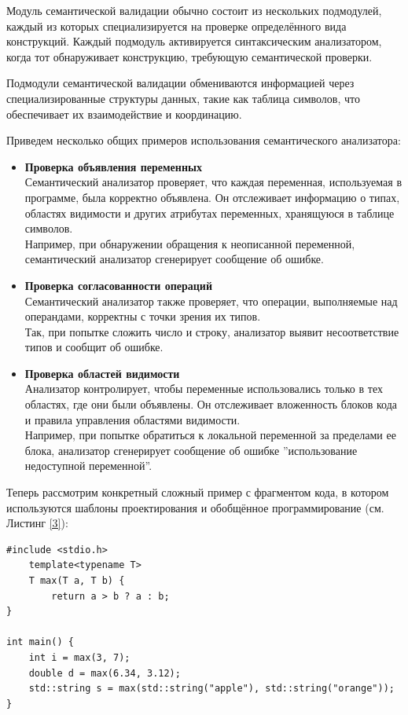 Модуль семантической валидации обычно состоит из нескольких подмодулей, каждый из которых специализируется на проверке определённого вида конструкций. Каждый подмодуль активируется синтаксическим анализатором, когда тот обнаруживает конструкцию, требующую семантической проверки.

Подмодули семантической валидации обмениваются информацией через специализированные структуры данных, такие как таблица символов, что обеспечивает их взаимодействие и координацию.


Приведем несколько общих примеров использования семантического анализатора:
\begin{itemize}[label = ---]

    \item \textbf{Проверка объявления переменных}\\
Семантический анализатор проверяет, что каждая переменная, используемая в программе, была корректно объявлена. Он отслеживает информацию о типах, областях видимости и других атрибутах переменных, хранящуюся в таблице символов.\\
Например, при обнаружении обращения к неописанной переменной, семантический анализатор сгенерирует сообщение об ошибке.
    \item \textbf{Проверка согласованности операций}\\
Семантический анализатор также проверяет, что операции, выполняемые над операндами, корректны с точки зрения их типов. \\Так, при попытке сложить число и строку, анализатор выявит несоответствие типов и сообщит об ошибке.
    \item \textbf{Проверка областей видимости}\\
Анализатор контролирует, чтобы переменные использовались только в тех областях, где они были объявлены. Он отслеживает вложенность блоков кода и правила управления областями видимости.\\
Например, при попытке обратиться к локальной переменной за пределами ее блока, анализатор сгенерирует сообщение об ошибке ”использование недоступной переменной”.
\end{itemize}

Теперь рассмотрим конкретный сложный пример с фрагментом кода, в котором используются шаблоны проектирования и обобщённое программирование (см. Листинг \ref{3}):
\begin{lstlisting}[label = 3, caption =  Фрагмент кода с шаблонами проектирования и обобщенным программированием]
    #include <stdio.h>
    template<typename T>
    T max(T a, T b) {
        return a > b ? a : b;
}

int main() {
    int i = max(3, 7);
    double d = max(6.34, 3.12);
    std::string s = max(std::string("apple"), std::string("orange"));
}
\end{lstlisting}

